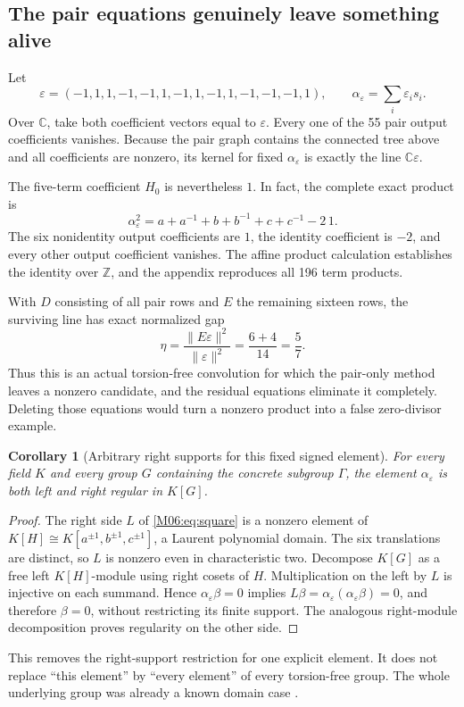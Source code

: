 \documentclass[11pt,a4paper,oneside]{report}
\newtheorem{corollary}[theorem]{Corollary}
\theoremstyle{definition}
\theoremstyle{remark}
\newcommand{\C}{\mathbb C}
\newcommand{\Z}{\mathbb Z}
\begin{document}
\subsection{The pair equations genuinely leave something alive}

Let
\begin{equation}\label{M06:eq:signs}
\varepsilon=(-1,1,1,-1,-1,1,-1,1,-1,1,-1,-1,-1,1),
\qquad \alpha_\varepsilon=\sum_i\varepsilon_i s_i.
\end{equation}
Over $\C$, take both coefficient vectors equal to $\varepsilon$. Every
one of the 55 pair output coefficients vanishes. Because the
pair graph contains the connected tree above and all coefficients
are nonzero, its kernel for fixed $\alpha_\varepsilon$ is exactly
the line $\C\varepsilon$.

The five-term coefficient $H_0$ is nevertheless $1$. In fact,
the complete exact product is
\begin{equation}\label{M06:eq:square}
\boxed{\alpha_\varepsilon^2
=a+a^{-1}+b+b^{-1}+c+c^{-1}-2\,1.}
\end{equation}
The six nonidentity output coefficients are $1$, the identity
coefficient is $-2$, and every other output coefficient vanishes.
The affine product calculation establishes the identity over
$\Z$, and the appendix reproduces all 196 term products.

With $D$ consisting of all pair rows and $E$ the remaining
sixteen rows, the surviving line has exact normalized gap
\begin{equation}\label{M06:eq:57}
\eta=\frac{\|E\varepsilon\|^2}{\|\varepsilon\|^2}
=\frac{6+4}{14}=\frac57.
\end{equation}
Thus this is an actual torsion-free convolution for which the
pair-only method leaves a nonzero candidate, and the residual
equations eliminate it completely. Deleting those equations
would turn a nonzero product into a false zero-divisor example.

\begin{corollary}[Arbitrary right supports for this fixed signed element]
\label{M06:cor:globalfixed}
For every field $K$ and every group $G$ containing the concrete
subgroup $\Gamma$, the element $\alpha_\varepsilon$ is both
left and right regular in $K[G]$.
\end{corollary}
\begin{proof}
The right side $L$ of \eqref{M06:eq:square} is a nonzero element
of $K[H]\cong K[a^{\pm1},b^{\pm1},c^{\pm1}]$, a Laurent
polynomial domain. The six translations are distinct, so $L$
is nonzero even in characteristic two. Decompose $K[G]$ as
a free left $K[H]$-module using right cosets of $H$.
Multiplication on the left by $L$ is injective on each summand.
Hence
$\alpha_\varepsilon\beta=0$ implies
$L\beta=\alpha_\varepsilon(\alpha_\varepsilon\beta)=0$,
and therefore $\beta=0$, without restricting its finite support.
The analogous right-module decomposition proves regularity
on the other side.
\end{proof}
This removes the right-support restriction for one explicit
element. It does not replace ``this element'' by ``every
element'' of every torsion-free group. The whole underlying
group was already a known domain case \cite{B:CP}.
\end{document}
